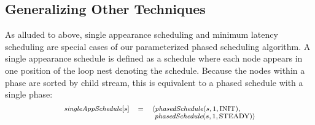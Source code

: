 \documentclass{sig-alt-full}
\begin{document}


\subsection{Generalizing Other Techniques}

As alluded to above, single appearance scheduling and minimum latency
scheduling are special cases of our parameterized phased scheduling
algorithm.  A single appearance schedule is defined as a schedule
where each node appears in one position of the loop nest denoting the
schedule.  Because the nodes within a phase are sorted by child
stream, this is equivalent to a phased schedule with a single phase:
\[
\small
\begin{array}{rcl}
\mt{singleAppSchedule}[s]  & = & \langle \mt{phasedSchedule}(s, 1, \mbox{INIT}), \\
                         ~ & ~ & ~ \mt{phasedSchedule}(s, 1, \mbox{STEADY}) \rangle
\end{array}
\]
\end{document}
